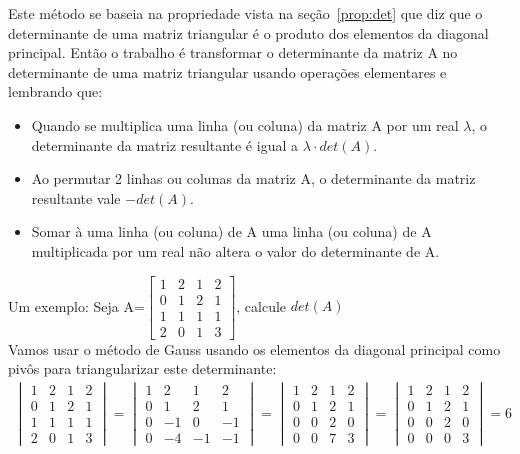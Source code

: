    Este método se baseia na propriedade vista na seção~\ref{prop:det} que diz que o determinante de uma matriz triangular é o produto dos elementos da diagonal principal. Então o trabalho é transformar o determinante da matriz A no determinante de uma matriz triangular usando operações elementares e lembrando que:
   \begin{itemize}
     \item Quando se multiplica uma linha (ou coluna) da matriz A por um real $\lambda $, o determinante da matriz resultante é igual a $\lambda \cdot det(A)$.
     \item Ao permutar 2 linhas ou colunas da matriz A, o determinante da matriz resultante vale $-det(A)$.
     \item Somar à uma linha (ou coluna) de A uma linha (ou coluna) de A multiplicada por um real não altera o valor do determinante de A.
   \end{itemize}
   Um exemplo: Seja A=$\begin{bmatrix}
     1 & 2 &  1 & 2 \\0 &  1 & 2 & 1\\1 &1 &1 &1\\2 & 0& 1 & 3
   \end{bmatrix}$, calcule $det(A)$\\
   Vamos usar o método de Gauss usando os elementos da diagonal principal como pivôs para
 triangularizar este determinante:
   \begin{align*}
    \begin{vmatrix}
      1 & 2 &  1 & 2 \\0 &  1 & 2 & 1\\1 &1 &1 &1\\2 & 0& 1 & 3
    \end{vmatrix}=
    \begin{vmatrix}
      1 & 2 &  1 & 2 \\0 &  1 & 2 & 1\\0 &-1 &0 &-1\\0 & -4& -1 & -1
    \end{vmatrix}=
    \begin{vmatrix}
      1 & 2 &  1 & 2 \\0 &  1 & 2 & 1\\0 &0 &2 &0\\0 & 0& 7 & 3
    \end{vmatrix}=
    \begin{vmatrix}
      1 & 2 &  1 & 2 \\0 &  1 & 2 & 1\\0 &0 &2 &0\\0 & 0& 0 & 3
    \end{vmatrix}=6
   \end{align*}
